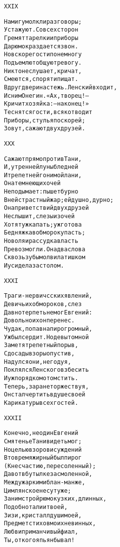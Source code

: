 \begin{minipage}[t]{\dimexpr 0.5\textwidth -\tabcolsep-.5pt}
\begin{alltt}\normalfont\centering
XXIX

На миг умолкли разговоры;
Уста жуют. Со всех сторон
Гремят тарелки и приборы
Да рюмок раздается звон.
Но вскоре гости понемногу
Подъемлют общую тревогу.
Никто не слушает, кричат,
Смеются, спорят и пищат.
Вдруг двери настежь. Ленский входит,
И с ним Онегин. «Ах, творец! —
Кричит хозяйка: — наконец!»
Теснятся гости, всяк отводит
Приборы, стулья поскорей;
Зовут, сажают двух друзей.
\end{alltt}
\end{minipage}

\begin{minipage}[t]{\dimexpr 0.5\textwidth -\tabcolsep-.5pt}
\begin{alltt}\normalfont\centering
XXX

Сажают прямо против Тани,
И, утренней луны бледней
И трепетней гонимой лани,
Она темнеющих очей
Не подымает: пышет бурно
В ней страстный жар; ей душно, дурно;
Она приветствий двух друзей
Не слышит, слезы из очей
Хотят уж капать; уж готова
Бедняжка в обморок упасть;
Но воля и рассудка власть
Превозмогли. Она два слова
Сквозь зубы молвила тишком
И усидела за столом.
\end{alltt}
\end{minipage}
\clearpage

\begin{minipage}[t]{\dimexpr 0.5\textwidth -\tabcolsep-.5pt}
\begin{alltt}\normalfont\centering
XXXI

Траги-нервичсских явлений,
Девичьих обмороков, слез
Давно терпеть не мог Евгений:
Довольно их он перенес.
Чудак, попав на пир огромный,
Уж был сердит. Но девы томной
Заметя трепетный порыв,
С досады взоры опустив,
Надулся он и, негодуя,
Поклялся Ленского взбесить
И уж порядком отомстить.
Теперь, заране торжествуя,
Он стал чертить в душе своей
Карикатуры всех гостей.
\end{alltt}
\end{minipage}

\begin{minipage}[t]{\dimexpr 0.5\textwidth -\tabcolsep-.5pt}
\begin{alltt}\normalfont\centering
XXXII

Конечно, не один Евгений
Смятенье Тани видеть мог;
Но целью взоров и суждений
В то время жирный был пирог
(К несчастию, пересоленный);
Да вот в бутылке засмоленной,
Между жарким и блан-манже,
Цимлянское несут уже;
За ним строй рюмок узких, длинных,
Подобно талии твоей,
Зизи, кристалл души моей,
Предмет стихов моих невинных,
Любви приманчивый фиал,
Ты, от кого я пьян бывал!
\end{alltt}
\end{minipage}
\clearpage

